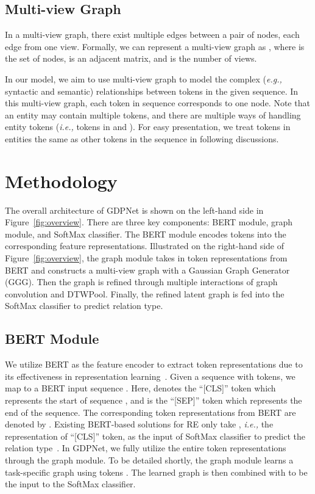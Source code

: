 \documentclass[letterpaper]{article} \usepackage{aaai21}  \usepackage{times}  \usepackage{helvet} \usepackage{courier}  \usepackage[hyphens]{url}  \usepackage{graphicx} \urlstyle{rm} \def\UrlFont{\rm}  \usepackage{graphicx}  \usepackage{natbib}  \usepackage{caption}
\newcommand{\ie}{\emph{i.e.,}\xspace}
\newcommand{\eg}{\emph{e.g.,}\xspace}
\begin{document}
\subsection{Multi-view Graph}
In a multi-view graph, there exist multiple edges between a pair of nodes, each edge from one view. Formally, we can represent a multi-view graph as , where  is the set of nodes,  is an adjacent matrix, and   is the number of views. 

In our model, we aim to use multi-view graph to model the complex (\eg syntactic and semantic) relationships between tokens in the given sequence. In this multi-view graph,  each token in sequence  corresponds to one node. Note that an entity may contain multiple tokens, and there are multiple ways of handling entity tokens (\ie tokens in  and ). For easy presentation, we treat tokens in entities the same as other tokens in the sequence in following discussions.  






\section{Methodology}
\label{sec:method}
The overall architecture of GDPNet is shown on the left-hand side in Figure~\ref{fig:overview}. There are three key components: BERT module, graph module, and SoftMax classifier. The BERT module encodes tokens into the corresponding feature representations. Illustrated on the right-hand side of Figure~\ref{fig:overview}, the graph module takes in token representations from BERT and constructs a multi-view graph with a Gaussian Graph Generator (GGG). Then the graph is refined through multiple interactions of graph convolution and DTWPool. Finally, the refined latent graph is fed into the SoftMax classifier to predict relation type.



\subsection{BERT Module}



We utilize BERT as the feature encoder to extract token representations due to its effectiveness in representation learning~\cite{joshi2020spanbert,yu-etal-2020-dialogue}. Given a sequence  with  tokens, we map  to a BERT input sequence . Here,  denotes the ``[CLS]'' token which represents the start of sequence , and  is the ``[SEP]'' token which represents the end of the sequence. The corresponding token representations from BERT are denoted by  . Existing BERT-based solutions for RE only take , \ie the representation of ``[CLS]'' token, as the input of SoftMax classifier to predict the relation type~\cite{joshi2020spanbert,yu-etal-2020-dialogue}. In GDPNet, we fully utilize the entire token representations  through the graph module. To be detailed shortly, the graph module learns a task-specific graph using tokens . The learned graph is then combined with  to be the input to the SoftMax classifier.  
\end{document}
